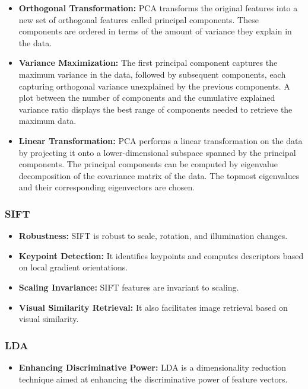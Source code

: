 \documentclass[a4paper]{article}
\theoremstyle{plain}
\theoremstyle{definition}
\begin{document}
{\begin{itemize}
    \item[] \textbf{Orthogonal Transformation:} PCA transforms the original features into a new set of orthogonal features called principal components. These components are ordered in terms of the amount of variance they explain in the data.
    
    \item[] \textbf{Variance Maximization:} The first principal component captures the maximum variance in the data, followed by subsequent components, each capturing orthogonal variance unexplained by the previous components. A plot between the number of components and the cumulative explained variance ratio displays the best range of components needed to retrieve the maximum data.
    
    \item[] \textbf{Linear Transformation:} PCA performs a linear transformation on the data by projecting it onto a lower-dimensional subspace spanned by the principal components. The principal components can be computed by eigenvalue decomposition of the covariance matrix of the data. The topmost eigenvalues and their corresponding eigenvectors are chosen.

\end{itemize}

\subsubsection{SIFT}
\begin{itemize}
    \item[] \textbf{Robustness:} SIFT is robust to scale, rotation, and illumination changes.
    
    \item[] \textbf{Keypoint Detection:} It identifies keypoints and computes descriptors based on local gradient orientations.
    
    \item[] \textbf{Scaling Invariance:} SIFT features are invariant to scaling.
    
    \item[] \textbf{Visual Similarity Retrieval:} It also facilitates image retrieval based on visual similarity.
\end{itemize}
\subsubsection{LDA}

\begin{itemize}
    \item[] \textbf{Enhancing Discriminative Power:} LDA is a dimensionality reduction technique aimed at enhancing the discriminative power of feature vectors.
    

\end{itemize}}
\end{document}
